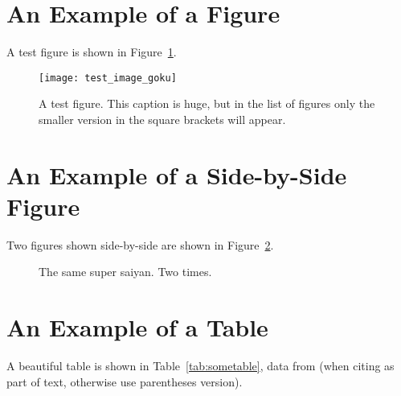 \blindtext

\section{An Example of a Figure}

A test figure is shown in Figure~\ref{fig:test1}.

\begin{figure}[ht!] %
	\centering
	\texttt{[image: test\_image\_goku]}
	\caption[This is the short caption for List of Figures]{A test figure.  This caption is huge, but in the list of figures only the smaller version in the square brackets will appear.}
	\label{fig:test1}
\end{figure}

\blindtext

\section{An Example of a Side-by-Side Figure}

Two figures shown side-by-side are shown in Figure~\ref{fig:test2}.

\begin{figure}[!ht]
	\centering
	\qquad
	\caption[Short Caption]{The same super saiyan. Two times.}        
	\label{fig:test2}
\end{figure}

\blindtext

\section{An Example of a Table}

A beautiful table is shown in Table~\ref{tab:sometable}, data from \citet{Ebejer2012} (when citing as part of text, otherwise use parentheses \citep{Ebejer2012} version).

